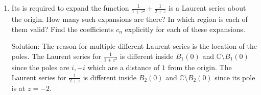 \documentclass[11pt]{article}
\newcommand{\C}{\mathbb{C}}
\begin{document}
\begin{enumerate}[(1)]
\begin{enumerate}
\end{enumerate}

\item Its is required to expand the function $\frac{1}{1 + z^2} + \frac{1}{2 + z}$ is a Laurent series about the origin. How many such expansions are there? In which region is each of them valid? Find the coefficients $c_n$ explicitly for each of these expansions.

Solution: The reason for multiple different Laurent series is the location of the poles. The Laurent series for $\frac{1}{1+z^2}$ is different inside $B_1(0)$ and $\C \setminus B_1(0)$ since the poles are $i, -i$ which are a distance of $1$ from the origin. The Laurent series for $\frac{1}{2+z}$ is different inside $B_2(0)$ and $\C \setminus B_2(0)$ since its pole is at $z = -2$. 


\end{enumerate}
\end{document}
